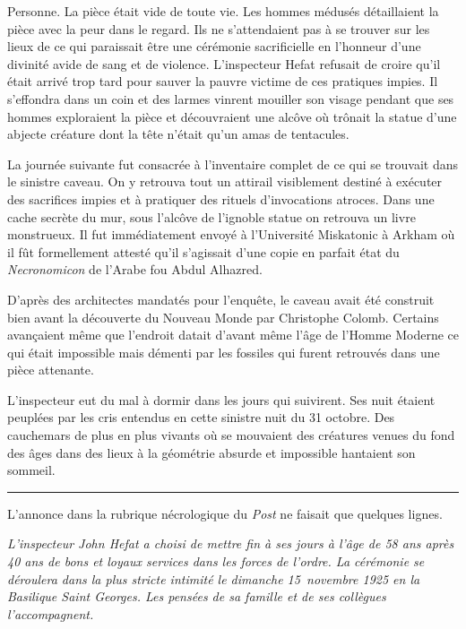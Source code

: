 \documentclass[12pt,a4paper,oneside]{memoir}
\begin{document}
Personne. La pièce était vide de toute vie. Les hommes médusés détaillaient la pièce avec la peur dans le regard. Ils 
ne s'attendaient pas à se trouver sur les lieux de ce qui paraissait être une cérémonie sacrificielle en l'honneur 
d'une divinité avide de sang et de violence. L'inspecteur Hefat refusait de croire qu'il était arrivé trop tard pour 
sauver la pauvre victime de ces pratiques impies. Il s'effondra dans un coin et des larmes vinrent mouiller son visage 
pendant que ses hommes exploraient la pièce et découvraient une alcôve où trônait la statue d'une abjecte créature dont 
la tête n'était qu'un amas de tentacules.

La journée suivante fut consacrée à l'inventaire complet de ce qui se trouvait dans le sinistre caveau. On y retrouva 
tout un attirail visiblement destiné à exécuter des sacrifices impies et à pratiquer des rituels d'invocations atroces. 
Dans une cache secrète du mur, sous l'alcôve de l'ignoble statue on retrouva un livre monstrueux. Il fut immédiatement 
envoyé à l'Université Miskatonic à Arkham où il fût formellement attesté qu'il s'agissait d'une copie en parfait état 
du 
\emph{Necronomicon} de l'Arabe fou Abdul Alhazred.

D'après des architectes mandatés pour l'enquête, le caveau avait été construit bien avant la découverte du Nouveau 
Monde par Christophe Colomb. Certains avançaient même que l'endroit datait d'avant même l'âge de l'Homme Moderne ce qui 
était impossible mais démenti par les fossiles qui furent retrouvés dans une pièce attenante.

L'inspecteur eut du mal à dormir dans les jours qui suivirent. Ses nuit étaient peuplées par les cris entendus en cette 
sinistre nuit du 31 octobre. Des cauchemars de plus en plus vivants où se mouvaient des créatures venues du 
fond des âges dans des lieux à la géométrie absurde et impossible hantaient son sommeil.

\fancybreak{$* * *$}

L'annonce dans la rubrique nécrologique du \emph{Post} ne faisait que quelques lignes.

\emph{L'inspecteur John Hefat a choisi de mettre fin à ses jours à l'âge de 58 ans après 40 ans de bons et loyaux 
services dans les forces de l'ordre. La cérémonie se déroulera dans la plus stricte intimité le dimanche 15 novembre 
1925 en la Basilique Saint Georges. Les pensées de sa famille et de ses collègues l'accompagnent.}
\end{document}
